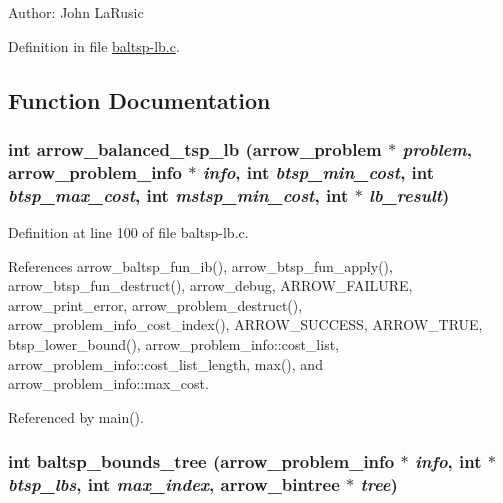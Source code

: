 \begin{Desc}
\item[Author:]John LaRusic \end{Desc}


Definition in file \hyperlink{lib_2baltsp_2baltsp-lb_8c-source}{baltsp-lb.c}.

\subsection{Function Documentation}
\hypertarget{lib_2baltsp_2baltsp-lb_8c_a07f69e287f6e6242771ce651c1d65c2}{
\subsubsection[{arrow\_\-balanced\_\-tsp\_\-lb}]{\setlength{\rightskip}{0pt plus 5cm}int arrow\_\-balanced\_\-tsp\_\-lb ({\bf arrow\_\-problem} $\ast$ {\em problem}, \/  {\bf arrow\_\-problem\_\-info} $\ast$ {\em info}, \/  int {\em btsp\_\-min\_\-cost}, \/  int {\em btsp\_\-max\_\-cost}, \/  int {\em mstsp\_\-min\_\-cost}, \/  int $\ast$ {\em lb\_\-result})}}
\label{lib_2baltsp_2baltsp-lb_8c_a07f69e287f6e6242771ce651c1d65c2}




Definition at line 100 of file baltsp-lb.c.

References arrow\_\-baltsp\_\-fun\_\-ib(), arrow\_\-btsp\_\-fun\_\-apply(), arrow\_\-btsp\_\-fun\_\-destruct(), arrow\_\-debug, ARROW\_\-FAILURE, arrow\_\-print\_\-error, arrow\_\-problem\_\-destruct(), arrow\_\-problem\_\-info\_\-cost\_\-index(), ARROW\_\-SUCCESS, ARROW\_\-TRUE, btsp\_\-lower\_\-bound(), arrow\_\-problem\_\-info::cost\_\-list, arrow\_\-problem\_\-info::cost\_\-list\_\-length, max(), and arrow\_\-problem\_\-info::max\_\-cost.

Referenced by main().\hypertarget{lib_2baltsp_2baltsp-lb_8c_f169c033b4bdc2c08c544daf0e91aa9a}{
\subsubsection[{baltsp\_\-bounds\_\-tree}]{\setlength{\rightskip}{0pt plus 5cm}int baltsp\_\-bounds\_\-tree ({\bf arrow\_\-problem\_\-info} $\ast$ {\em info}, \/  int $\ast$ {\em btsp\_\-lbs}, \/  int {\em max\_\-index}, \/  {\bf arrow\_\-bintree} $\ast$ {\em tree})}}
\label{lib_2baltsp_2baltsp-lb_8c_f169c033b4bdc2c08c544daf0e91aa9a}


